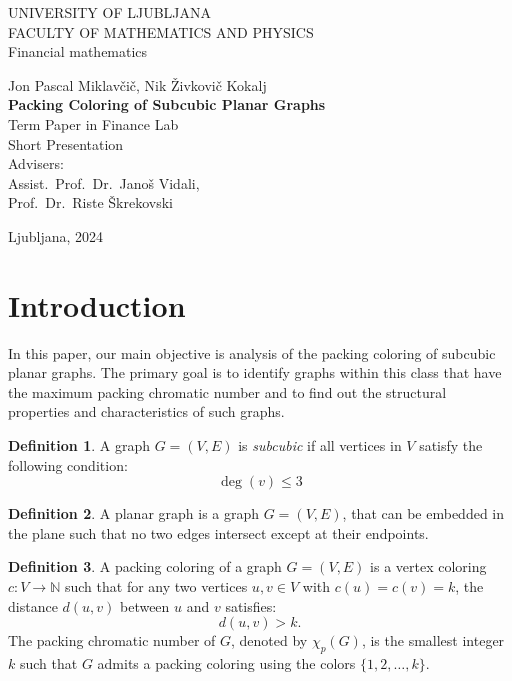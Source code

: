 \documentclass[12pt,a4paper]{amsart}
\theoremstyle{definition}
\newtheorem{definicija}{Definition}[section]
\theoremstyle{plain}
\newcommand{\program}{Financial mathematics}
\newcommand{\imeavtorja}{Jon Pascal Miklavčič, Nik Živkovič Kokalj}
\newcommand{\imementorja}{Assist.~Prof.~Dr.~Janoš Vidali}
\newcommand{\imesomentorja}{Prof.~Dr.~Riste Škrekovski}
\newcommand{\naslovdela}{Packing Coloring of Subcubic Planar Graphs}
\newcommand{\letnica}{2024}
\begin{document}
\thispagestyle{empty}
{\large
\noindent UNIVERSITY OF LJUBLJANA\\[1mm]
FACULTY OF MATHEMATICS AND PHYSICS\\[5mm]
\program\ }
\vfill

\begin{center}{\large
\imeavtorja\\[2mm]
{\bf \Large \naslovdela}\\[10mm]
{\normalsize Term Paper in Finance Lab}\\[1mm]
{\normalsize Short Presentation}\\[1cm]
{\normalsize Advisers:}\\
{\normalsize \imementorja, \\ \imesomentorja}\\[2mm]}
\end{center}
\vfill

{\large Ljubljana, \letnica}
\pagebreak

\section{Introduction}

In this paper, our main objective is analysis of the packing coloring of subcubic planar graphs. The primary goal is to identify graphs within this class that have the maximum packing chromatic number and to find out the structural properties and characteristics of such graphs.

\begin{definicija}
    A graph $G=(V,E)$ is \emph{subcubic} if all vertices in $V$ satisfy the following condition:
    $$
    \operatorname{deg}(v) \leq 3
    $$
\end{definicija}

\begin{definicija}
    A planar graph is a graph $G=(V, E)$, that can be embedded in the plane such that no two edges intersect except at their endpoints.
\end{definicija}

\begin{definicija}
    A packing coloring of a graph $G=(V, E)$ is a vertex coloring $c: V \to \mathbb{N}$ such that for any two vertices $u, v \in V$ with $c(u)=c(v)=k$, the distance $d(u, v)$ between $u$ and $v$ satisfies:
    $$
    d(u, v)>k.
    $$
    The packing chromatic number of $G$, denoted by $\chi_p(G)$, is the smallest integer $k$ such that $G$ admits a packing coloring using the colors $\{1,2, \ldots, k\}$.
\end{definicija}
\end{document}
